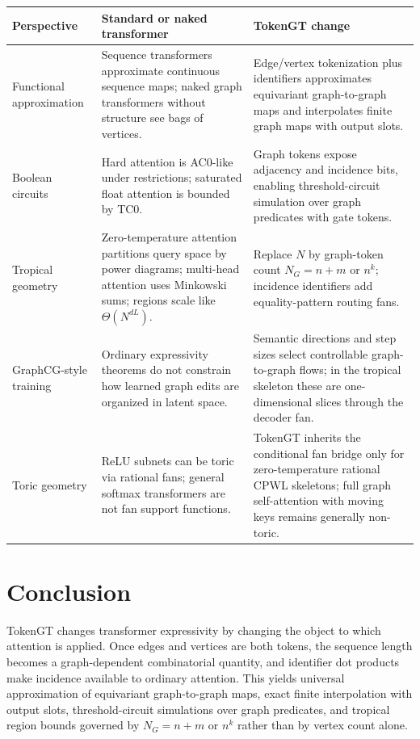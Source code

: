 \documentclass[11pt]{article}
\begin{document}
\begin{longtable}{>{\raggedright\arraybackslash}p{} >{\raggedright\arraybackslash}p{} >{\raggedright\arraybackslash}p{}}
\toprule
Perspective & Standard or naked transformer & TokenGT change \\
\midrule
\endhead
Functional approximation & Sequence transformers approximate continuous sequence maps; naked graph transformers without structure see bags of vertices. & Edge/vertex tokenization plus identifiers approximates equivariant graph-to-graph maps and interpolates finite graph maps with output slots. \\
\addlinespace
Boolean circuits & Hard attention is AC0-like under restrictions; saturated float attention is bounded by TC0. & Graph tokens expose adjacency and incidence bits, enabling threshold-circuit simulation over graph predicates with gate tokens. \\
\addlinespace
Tropical geometry & Zero-temperature attention partitions query space by power diagrams; multi-head attention uses Minkowski sums; regions scale like $\Theta(N^{dL})$. & Replace $N$ by graph-token count $N_G=n+m$ or $n^k$; incidence identifiers add equality-pattern routing fans. \\
\addlinespace
GraphCG-style training & Ordinary expressivity theorems do not constrain how learned graph edits are organized in latent space. & Semantic directions and step sizes select controllable graph-to-graph flows; in the tropical skeleton these are one-dimensional slices through the decoder fan. \\
\addlinespace
Toric geometry & ReLU subnets can be toric via rational fans; general softmax transformers are not fan support functions. & TokenGT inherits the conditional fan bridge only for zero-temperature rational CPWL skeletons; full graph self-attention with moving keys remains generally non-toric. \\
\bottomrule
\end{longtable}

\section{Conclusion}

TokenGT changes transformer expressivity by changing the object to which attention is applied.  Once edges and vertices are both tokens, the sequence length becomes a graph-dependent combinatorial quantity, and identifier dot products make incidence available to ordinary attention.  This yields universal approximation of equivariant graph-to-graph maps, exact finite interpolation with output slots, threshold-circuit simulations over graph predicates, and tropical region bounds governed by $N_G=n+m$ or $n^k$ rather than by vertex count alone.
\end{document}
